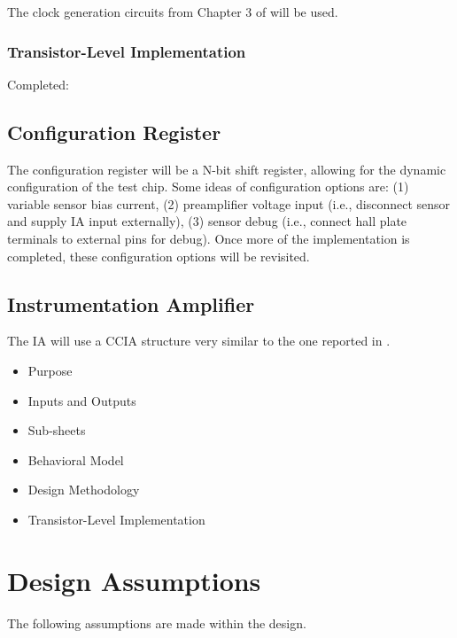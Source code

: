 \documentclass{article}
\begin{document}
The clock generation circuits from Chapter 3 of \cite{Jiang2019CMOSWideBandwidth} will be used. 

\subsubsection*{Transistor-Level Implementation}

Completed: \textcolor{green}{\checkmark}

\subsection{Configuration Register}

The configuration register will be a N-bit shift register, allowing for the dynamic
configuration of the test chip. Some ideas of configuration options are: (1) variable sensor
bias current, (2) preamplifier voltage input (i.e., disconnect sensor and supply IA input externally),
(3) sensor debug (i.e., connect hall plate terminals to external pins for debug). 
Once more of the implementation is completed, these configuration options will be revisited.

\subsection{Instrumentation Amplifier}

The IA will use a CCIA structure very similar to the one reported in \cite{Zou2023CMOSHallArray}.

\begin{itemize}
    \item{Purpose}
    \item{Inputs and Outputs}
    \item{Sub-sheets}
    \item{Behavioral Model}
    \item{Design Methodology}
    \item{Transistor-Level Implementation}
\end{itemize}

\newpage

\section{Design Assumptions}

The following assumptions are made within the design.
\end{document}
